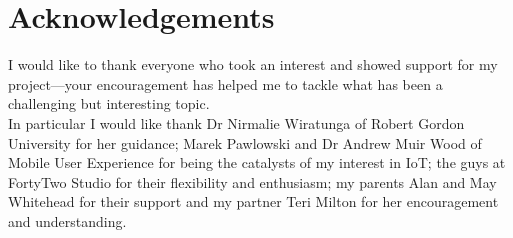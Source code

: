 \chapter{Acknowledgements}
  I would like to thank everyone who took an interest and showed support for my project---your encouragement has helped me to tackle what has been a challenging but interesting topic.\\

  \noindent In particular I would like thank Dr Nirmalie Wiratunga of Robert Gordon University for her guidance; Marek Pawlowski and Dr Andrew Muir Wood of Mobile User Experience for being the catalysts of my interest in IoT; the guys at FortyTwo Studio for their flexibility and enthusiasm; my parents Alan and May Whitehead for their support and my partner Teri Milton for her encouragement and understanding.
